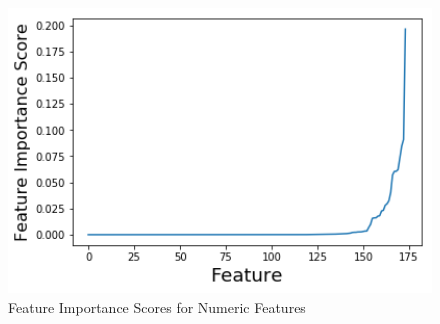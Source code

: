 \begin{figure}[h]
	\centering
		\includegraphics[width=12cm]{graphics/feature_importance_numeric.png}
	\caption{Feature Importance Scores for Numeric Features}
	\label{feature_importance_numeric_graphic}
\end{figure}
